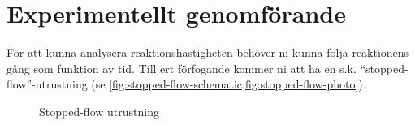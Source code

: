 \section{Experimentellt genomförande}
\label{sec:exper}
För att kunna analysera reaktionshastigheten behöver ni kunna följa
reaktionens gång som funktion av tid. Till ert förfogande kommer ni att ha en
s.k. ``stopped-flow''-utrustning (se \cref{fig:stopped-flow-schematic,fig:stopped-flow-photo}).

\begin{figure}[h]
  \centering
  \caption{Stopped-flow utrustning}
\end{figure}


